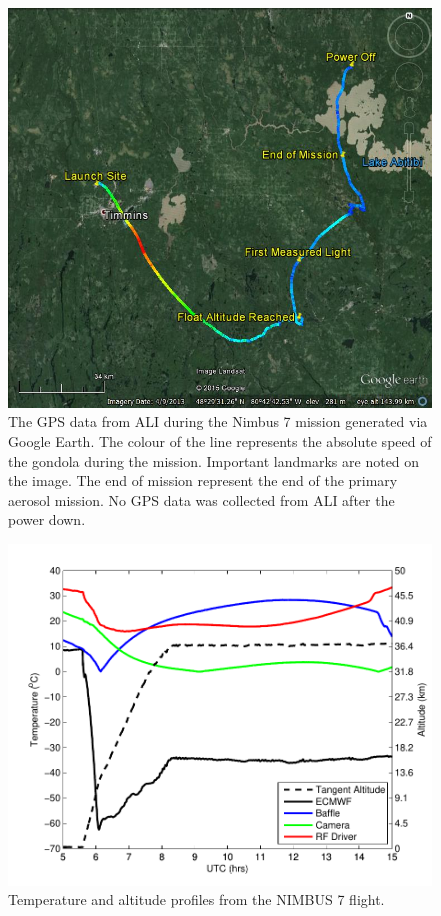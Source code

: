 \documentclass[12pt]{article}
\begin{document}
\newpage

\begin{figure}
    \includegraphics[width=1.0\textwidth]{./Images/5-1-AliGpsDataGoogleMaps.jpg}
    \caption{The GPS data from ALI during the Nimbus 7 mission generated via Google Earth. The colour of the line represents the absolute speed of the gondola during the mission. Important landmarks are noted on the image. The end of mission represent the end of the primary aerosol mission. No GPS data was collected from ALI after the power down.}
    \label{fig:5.1:nimbus7FlightPath}
\end{figure}

\newpage

\begin{figure}
    \includegraphics[width=1.0\textwidth]{./Images/Temperatures.pdf}
    \caption{Temperature and altitude profiles from the NIMBUS 7 flight.}
    \label{fig:nimbus7Temps}
\end{figure}
\end{document}
